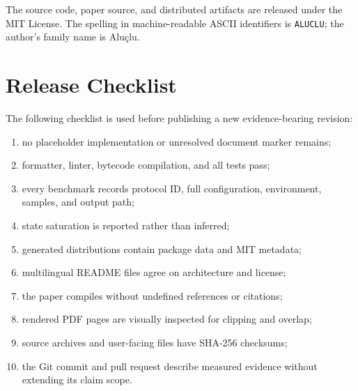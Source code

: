 The source code, paper source, and distributed artifacts are released under
the MIT License. The spelling in machine-readable ASCII identifiers is
\texttt{ALUCLU}; the author's family name is Aluçlu.

\section{Release Checklist}
\label{app:release-checklist}

The following checklist is used before publishing a new evidence-bearing
revision:

\begin{enumerate}
  \item no placeholder implementation or unresolved document marker remains;
  \item formatter, linter, bytecode compilation, and all tests pass;
  \item every benchmark records protocol ID, full configuration, environment,
  samples, and output path;
  \item state saturation is reported rather than inferred;
  \item generated distributions contain package data and MIT metadata;
  \item multilingual README files agree on architecture and license;
  \item the paper compiles without undefined references or citations;
  \item rendered PDF pages are visually inspected for clipping and overlap;
  \item source archives and user-facing files have SHA-256 checksums;
  \item the Git commit and pull request describe measured evidence without
  extending its claim scope.
\end{enumerate}
